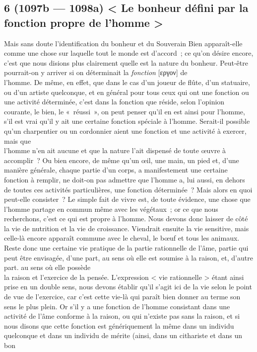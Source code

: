 \documentclass[french,twoside]{book} %
\begin{document}
\subsection[{6 (1097b — 1098a) < Le bonheur défini par la fonction propre de l’homme >}]{6 (1097b — 1098a) < Le bonheur défini par la fonction propre de l’homme >}
\noindent Mais sans doute l’identification du bonheur et du Souverain Bien apparaît-elle comme une chose sur laquelle tout le monde est d’accord ; ce qu’on désire encore, c’est que nous disions plus clairement quelle est la nature du bonheur. Peut-être pourrait-on y arriver si on déterminait la {\itshape fonction} [εργον] de \\
l’homme. De même, en effet, que dans le cas d’un joueur de flûte, d’un statuaire, ou d’un artiste quelconque, et en général pour tous ceux qui ont une fonction ou une activité déterminée, c’est dans la fonction que réside, selon l’opinion courante, le bien, le « réussi », on peut penser qu’il en est ainsi pour l’homme, s’il est vrai qu’il y ait une certaine fonction spéciale à l’homme. Serait-il possible qu’un charpentier ou un cordonnier aient une fonction et une activité à exercer, mais que \\
l’homme n’en ait aucune et que la nature l’ait dispensé de toute œuvre à accomplir ? Ou bien encore, de même qu’un œil, une main, un pied et, d’une manière générale, chaque partie d’un corps, a manifestement une certaine fonction à remplir, ne doit-on pas admettre que l’homme a, lui aussi, en dehors de toutes ces activités particulières, une fonction déterminée ? Mais alors en quoi peut-elle consister ? Le simple fait de vivre est, de toute évidence, une chose que l’homme partage en commun même avec les végétaux ; or ce que nous recherchons, c’est ce qui est propre à l’homme. Nous devons  donc laisser de côté la vie de nutrition et la vie de croissance. Viendrait ensuite la vie sensitive, mais celle-là encore apparaît commune avec le cheval, le bœuf et tous les animaux. Reste donc une certaine vie pratique de la partie rationnelle de l’âme, partie qui peut être envisagée, d’une part, au sens où elle est soumise à la raison, et, d’autre part. au sens où elle possède \\
la raison et l’exercice de la pensée. L’expression < vie rationnelle > étant ainsi prise en un double sens, nous devons établir qu’il s’agit ici de la vie selon le point de vue de l’exercice, car c’est cette vie-là qui paraît bien donner au terme son sens le plus plein. Or s’il y a une fonction de l’homme consistant dans une activité de l’âme conforme à la raison, ou qui n’existe pas sans la raison, et si nous disons que cette fonction est génériquement la même dans un individu quelconque et dans un individu de mérite (ainsi, dans un cithariste et dans un bon \\
\end{document}
